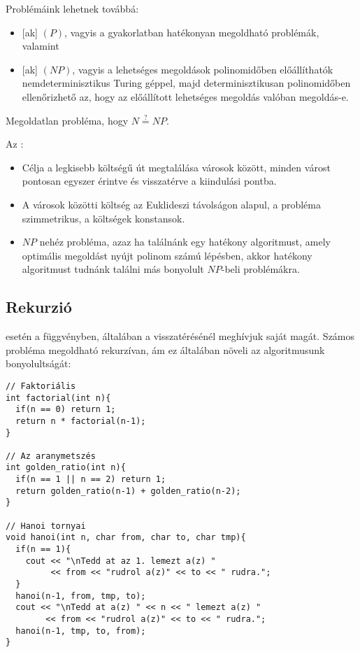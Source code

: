 \documentclass[../../main.tex]{subfiles}
\begin{document}
Problémáink lehetnek továbbá:
\begin{itemize}
	\item {}[ak] $(P)$, vagyis a gyakorlatban
	      hatékonyan megoldható problémák, valamint
	\item {}[ak] $(NP)$, vagyis a lehetséges megoldások
	      polinomidőben előállíthatók nemdeterminisztikus Turing géppel,
	      majd determinisztikusan polinomidőben ellenőrizhető az,
	      hogy az előállított lehetséges megoldás valóban megoldás-e.
\end{itemize}
Megoldatlan probléma, hogy $N \overset{?}{=} NP$.

Az :
\begin{itemize}
	\item Célja a legkisebb költségű út megtalálása városok között, minden
	      várost pontosan egyszer érintve és visszatérve a kiindulási pontba.

	\item A városok közötti költség az Euklideszi távolságon alapul,
	      a probléma szimmetrikus, a költségek konstansok.

	\item $NP$ nehéz probléma, azaz ha találnánk egy hatékony algoritmust,
	      amely optimális megoldást nyújt polinom számú lépésben, akkor hatékony
	      algoritmust tudnánk találni más bonyolult $NP$-beli problémákra.
\end{itemize}

\subsection{Rekurzió}

 esetén a függvényben, általában a visszatérésénél meghívjuk
saját magát. Számos probléma megoldható rekurzívan, ám ez általában növeli
az algoritmusunk bonyolultságát:

\begin{verbatim}
// Faktoriális
int factorial(int n){
  if(n == 0) return 1;
  return n * factorial(n-1);
}

// Az aranymetszés
int golden_ratio(int n){
  if(n == 1 || n == 2) return 1;
  return golden_ratio(n-1) + golden_ratio(n-2);
}

// Hanoi tornyai
void hanoi(int n, char from, char to, char tmp){
  if(n == 1){
    cout << "\nTedd at az 1. lemezt a(z) "
         << from << "rudrol a(z)" << to << " rudra.";
  }
  hanoi(n-1, from, tmp, to);
  cout << "\nTedd at a(z) " << n << " lemezt a(z) "
        << from << "rudrol a(z)" << to << " rudra.";
  hanoi(n-1, tmp, to, from);
}
\end{verbatim}
\end{document}
